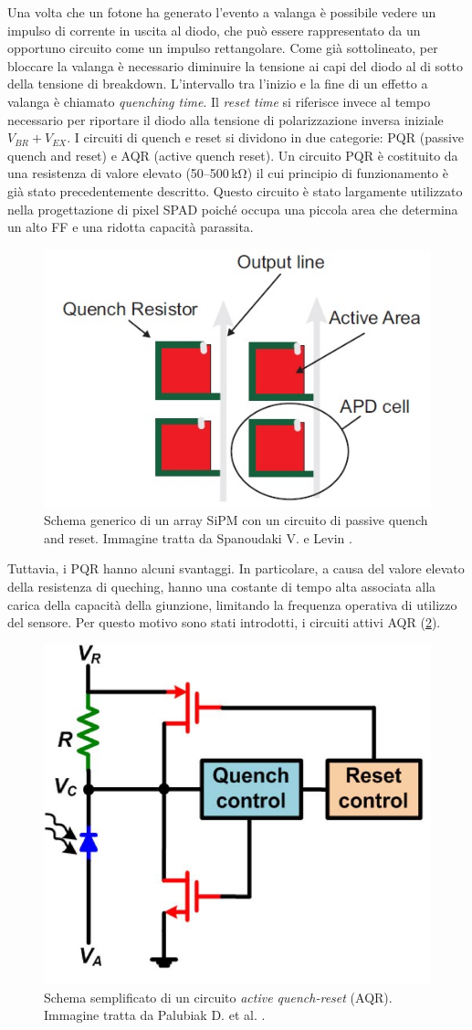 Una volta che un fotone ha generato l'evento a valanga è possibile vedere un impulso di corrente in uscita al diodo, che può essere rappresentato da un opportuno circuito come un impulso rettangolare. Come già sottolineato, per bloccare la valanga è necessario diminuire la tensione ai capi del diodo al di sotto della tensione di breakdown. L'intervallo tra l'inizio e la fine di un effetto a valanga è chiamato \textit{quenching time}. Il \textit{reset time} si riferisce invece al tempo necessario per riportare il diodo alla tensione di polarizzazione inversa iniziale $V_{BR}+V_{EX}$. I circuiti di quench e reset si dividono in due categorie: PQR (passive quench and reset) e AQR (active quench reset). Un circuito PQR è costituito da una resistenza di valore elevato (\numrange[range-phrase=--]{50}{500}\,\unit{\kilo\ohm}) il cui principio di funzionamento è già stato precedentemente descritto. Questo circuito è stato largamente utilizzato nella progettazione di pixel SPAD poiché occupa una piccola area che determina un alto FF e una ridotta capacità parassita. 
\begin{figure}[tbh]
	\centering
	\includegraphics[width=0.6\linewidth]{./ImageFiles/pqr_pixels.jpg}
	\caption{Schema generico di un array SiPM con un circuito di passive quench and reset. Immagine tratta da Spanoudaki V. e Levin \cite{Spanoudaki2010}.}
	\label{fig:aqr}
\end{figure} 
Tuttavia, i PQR hanno alcuni svantaggi. In particolare, a causa del valore elevato della resistenza di queching, hanno una costante di tempo alta associata alla carica della capacità della giunzione, limitando la frequenza operativa di utilizzo del sensore. Per questo motivo sono stati introdotti, i circuiti attivi AQR (\Fig\ref{fig:aqr}).
\begin{figure}[tbh]
	\centering
	\includegraphics[width=0.4\linewidth]{./ImageFiles/aqr.jpg}
	\caption{Schema semplificato di un circuito \textit{active quench-reset} (AQR). Immagine tratta da Palubiak D. et al. \cite{Palubiak2011}.}
	\label{fig:aqr}
\end{figure} 
